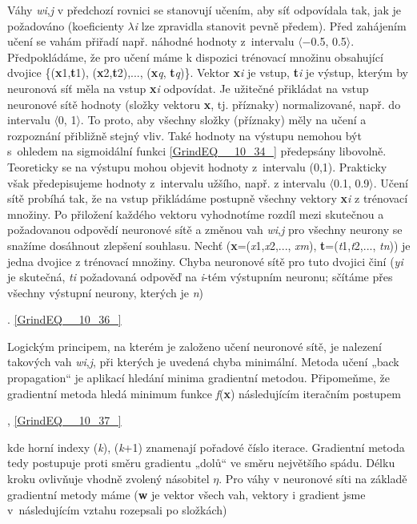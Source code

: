 \noindent Váhy \textit{wi},\textit{j} v předchozí rovnici se stanovují učením, aby síť odpovídala tak, jak je požadováno (koeficienty $\lambda$\textit{i} lze zpravidla stanovit pevně předem). Před zahájením učení se vahám přiřadí např. náhodné hodnoty z~intervalu $\langle$$-$0.5, 0.5$\rangle$. Předpokládáme, že pro učení máme k dispozici trénovací množinu obsahující dvojice \{(\textbf{x}1,\textbf{t}1), (\textbf{x}2,\textbf{t}2),..., (\textbf{x}\textit{q}, \textbf{t}\textit{q})\}. Vektor \textbf{x}\textit{i} je vstup, \textbf{t}\textit{i} je výstup, kterým by neuronová síť měla na vstup \textbf{x}\textit{i} odpovídat. Je užitečné přikládat na vstup neuronové sítě hodnoty (složky vektoru \textbf{x}, tj. příznaky) normalizované, např. do intervalu $\langle$0, 1$\rangle$. To proto, aby všechny složky (příznaky) měly na učení a rozpoznání přibližně stejný vliv. Také hodnoty na výstupu nemohou být s~ohledem na sigmoidální funkci \eqref{GrindEQ__10_34_} předepsány libovolně. Teoreticky se na výstupu mohou objevit hodnoty z~intervalu (0,1). Prakticky však předepisujeme hodnoty z~intervalu užšího, např. z intervalu $\langle$0.1, 0.9$\rangle$. Učení sítě probíhá tak, že na vstup přikládáme postupně všechny vektory \textbf{x}\textit{i} z trénovací množiny. Po přiložení každého vektoru vyhodnotíme rozdíl mezi skutečnou a požadovanou odpovědí neuronové sítě a změnou vah \textit{wi},\textit{j} pro všechny neurony se snažíme dosáhnout zlepšení souhlasu. Nechť (\textbf{x}=(\textit{x}1,\textit{x}2,..., \textit{xm}), \textbf{t}=(\textit{t}1,\textit{t}2,..., \textit{tn})) je jedna dvojice z trénovací množiny. Chyba neuronové sítě pro tuto dvojici činí (\textit{yi} je skutečná, \textit{ti} požadovaná odpověď na \textit{i}-tém výstupním neuronu; sčítáme přes všechny výstupní neurony, kterých je \textit{n})

 . \eqref{GrindEQ__10_36_}

\noindent Logickým principem, na kterém je založeno učení neuronové sítě, je nalezení takových vah \textit{wi},\textit{j}, při kterých je uvedená chyba minimální. Metoda učení „back propagation`` je aplikací hledání minima gradientní metodou. Připomeňme, že gradientní metoda hledá minimum funkce \textit{f}(\textbf{x}) následujícím iteračním postupem

 , \eqref{GrindEQ__10_37_}

\noindent kde horní indexy (\textit{k}), (\textit{k}+1) znamenají pořadové číslo iterace. Gradientní metoda tedy postupuje proti směru gradientu „dolů`` ve směru největšího spádu. Délku kroku ovlivňuje vhodně zvolený násobitel $\eta$. Pro váhy v neuronové síti na základě gradientní metody máme (\textbf{w} je vektor všech vah, vektory i gradient jsme v~následujícím vztahu rozepsali po složkách)

